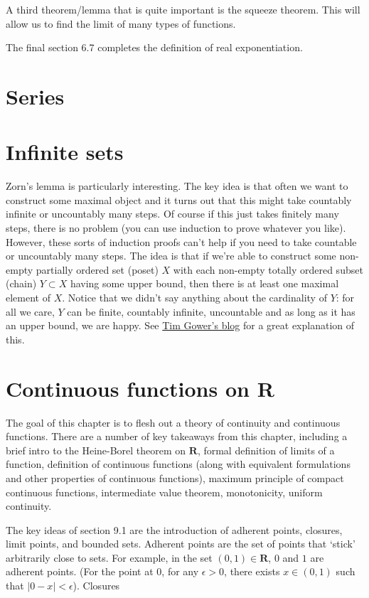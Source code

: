 \documentclass[answers,12pt]{exam}
\begin{document}
A third theorem/lemma that is quite important is the squeeze theorem.
This will allow us to find the limit of many types of functions.

The final section 6.7 completes the definition of real exponentiation.

\section{Series}


\section{Infinite sets}
Zorn's lemma is particularly interesting.
The key idea is that often we want to construct some maximal object and it turns out that this might take countably infinite or uncountably many steps.
Of course if this just takes finitely many steps, there is no problem (you can use induction to prove whatever you like).
However, these sorts of induction proofs can't help if you need to take countable or uncountably many steps.
The idea is that if we're able to construct some non-empty partially ordered set (poset) $X$ with each non-empty totally ordered subset (chain) $Y \subset X$ having some upper bound, then there is at least one maximal element of $X$.
Notice that we didn't say anything about the cardinality of $Y$: for all we care, $Y$ can be finite, countably infinite, uncountable and as long as it has an upper bound, we are happy.
See \href{https://gowers.wordpress.com/2008/08/12/how-to-use-zorns-lemma/}{Tim Gower's blog} for a great explanation of this.

\section{Continuous functions on R}
The goal of this chapter is to flesh out a theory of continuity and continuous functions.
There are a number of key takeaways from this chapter, including a brief intro to the Heine-Borel theorem on $\mathbf{R}$, formal definition of limits of a function, definition of continuous functions (along with equivalent formulations and other properties of continuous functions), maximum principle of compact continuous functions, intermediate value theorem, monotonicity, uniform continuity.

The key ideas of section 9.1 are the introduction of adherent points, closures, limit points, and bounded sets.
Adherent points are the set of points that `stick' arbitrarily close to sets.
For example, in the set $(0,1) \in \mathbf{R}$, $0$ and $1$ are adherent points.
(For the point at 0, for any $\epsilon > 0$, there exists $x \in (0,1)$ such that $|0-x|< \epsilon$).
Closures 
\end{document}
